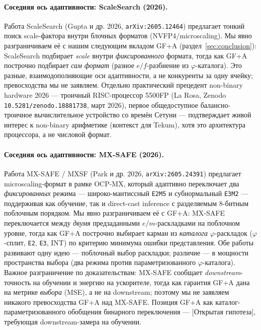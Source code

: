 \documentclass[11pt,a4paper]{article}
\theoremstyle{plain}
\begin{document}
\paragraph{Соседняя ось адаптивности: ScaleSearch (2026).}
Работа ScaleSearch (Gupta и др. 2026, \texttt{arXiv:2605.12464})
предлагает тонкий поиск scale-фактора внутри блочных
форматов (NVFP4/microscaling). Мы явно разграничиваем её с
нашим следующим вкладом GF+A (раздел~\ref{sec:conclusion}):
ScaleSearch подбирает \emph{scale} внутри \emph{фиксированного}
формата, тогда как GF+A построчно подбирает \emph{сам формат}
(разное \(e/f\)-разбиение из \(\varphi\)-каталога). Это разные,
взаимодополняющие оси адаптивности, а не конкуренты за одну
ячейку; превосходства мы не заявляем. Отдельно практический
прецедент non-binary hardware 2026 --- троичный RISC-процессор
5500FP (La Rosa, Zenodo \texttt{10.5281/zenodo.18881738}, март 2026),
первое общедоступное балансно-троичное вычислительное
устройство со времён Сетуни --- подтверждает живой интерес к
non-binary арифметике (контекст для Tekum), хотя это
архитектура процессора, а не числовой формат.

\paragraph{Соседняя ось адаптивности: MX-SAFE (2026).}
Работа MX-SAFE / MXSF (Park и др. 2026, \texttt{arXiv:2605.24391})
предлагает microscaling-формат в рамке OCP-MX, который
адаптивно переключает два \emph{фиксированных} режима ---
широко-мантиссный \texttt{E2M5} и субнормальный \texttt{E3M2} ---
поддерживая как обучение, так и direct-cast inference с разделяемым
8-битным поблочным порядком. Мы явно разграничиваем её с GF+A:
MX-SAFE переключается между \emph{двумя} предзаданными
\(e/m\)-раскладками на поблочном уровне, тогда как GF+A построчно
выбирает карман из \emph{каталога} \(\varphi\)-раскладок (\(\varphi\)-сплит,
\texttt{E2}, \texttt{E3}, INT) по критерию минимума ошибки представления.
Обе работы развивают одну идею --- поблочный выбор раскладки;
различие --- в мощности пространства выбора (два режима против
параметризованного \(\varphi\)-каталога). Важное разграничение по
доказательствам: MX-SAFE сообщает \emph{downstream}-точность на
обучении и энергию на ускорителе, тогда как гарантия GF+A дана
на метрике \emph{выбора} (MSE), а не на downstream; поэтому мы не
заявляем никакого превосходства GF+A над MX-SAFE. Позиция GF+A
как каталог-параметризованного обобщения бинарного переключения
--- [Открытая гипотеза], требующая downstream-замера на обучении.
\end{document}
